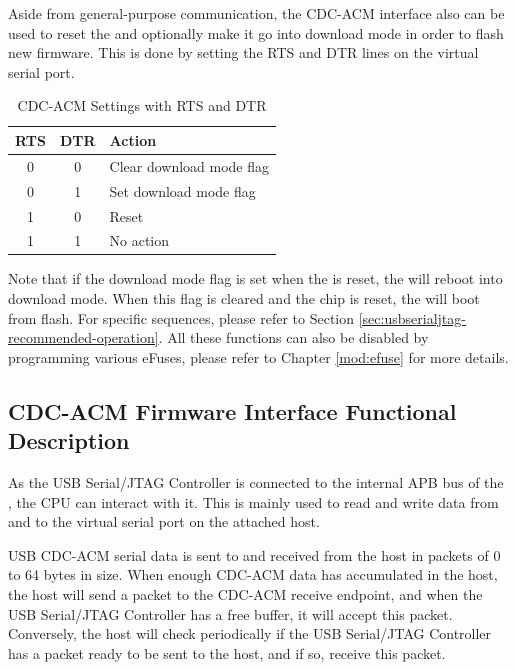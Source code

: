 \documentclass[main\_\_EN.tex]{subfiles}
\begin{document}
Aside from general-purpose communication, the CDC-ACM interface also can be used to reset the \chipname{} and optionally make it go into download mode in order to flash new firmware. This is done by setting the RTS and DTR lines on the virtual serial port.

\begin{table}[H] 
    \centering
    \caption{CDC-ACM Settings with RTS and DTR}
    \label{tab:usbserialjtag-cdc-acm-settings-with-rts-and-dtr}
    
    \begin{tabular}{ | c | c | p{5cm} | }
    \hline
        \rowcolor{lightgray}
        \textbf{RTS} & \textbf{DTR} & \textbf{Action}\\\hline
        
        0 & 0 & Clear download mode flag  \\\hline
        0 & 1 & Set download mode flag  \\\hline
        1 & 0 & Reset \chipname{}  \\\hline
        1 & 1 & No action \\\hline
    \end{tabular}
\end{table}

Note that if the download mode flag is set when the \chipname{} is reset, the \chipname{} will reboot into download mode. When this flag is cleared and the chip is reset, the \chipname{} will boot from flash. For specific sequences, please refer to Section \ref{sec:usbserialjtag-recommended-operation}. All these functions can also be disabled by programming various eFuses, please refer to Chapter \ref{mod:efuse} \textit{} for more details.

\subsection{CDC-ACM Firmware Interface Functional Description}

As the USB Serial/JTAG Controller is connected to the internal APB bus of the \chipname{}, the CPU can interact with it. This is mainly used to read and write data from and to the virtual serial port on the attached host.

USB CDC-ACM serial data is sent to and received from the host in packets of 0 to 64 bytes in size. When enough CDC-ACM data has accumulated in the host, the host will send a packet to the CDC-ACM receive endpoint, and when the USB Serial/JTAG Controller has a free buffer, it will accept this packet. Conversely, the host will check periodically if the USB Serial/JTAG Controller has a packet ready to be sent to the host, and if so, receive this packet.
\end{document}
